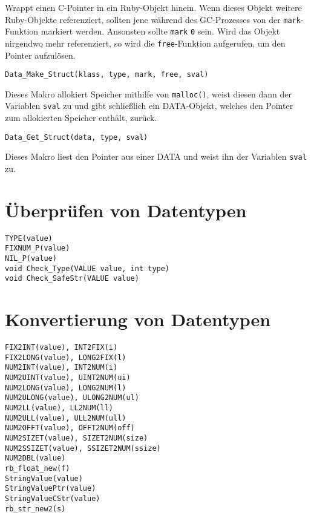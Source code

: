 \noindent Wrappt einen C-Pointer in ein Ruby-Objekt hinein. Wenn
dieses Objekt weitere Ruby-Objekte referenziert, sollten jene während
des GC-Prozesses von der \verb+mark+-Funktion markiert werden.
Ansonsten sollte \verb+mark+ \verb+0+ sein. Wird das Objekt nirgendwo
mehr referenziert, so wird die \verb+free+-Funktion aufgerufen, um den
Pointer aufzulösen.

\begin{lstlisting}
Data_Make_Struct(klass, type, mark, free, sval)
\end{lstlisting}

\noindent Dieses Makro allokiert Speicher mithilfe von
\verb+malloc()+, weist diesen dann der Variablen \verb+sval+ zu und
gibt schließlich ein DATA-Objekt, welches den Pointer zum allokierten
Speicher enthält, zurück.

\begin{lstlisting}
Data_Get_Struct(data, type, sval)
\end{lstlisting}

\noindent Dieses Makro liest den Pointer aus einer DATA und weist ihn
der Variablen \verb+sval+ zu.

\section{Überprüfen von Datentypen}
\label{sec:api:datentypen}

\begin{lstlisting}
TYPE(value)
FIXNUM_P(value)
NIL_P(value)
void Check_Type(VALUE value, int type)
void Check_SafeStr(VALUE value)
\end{lstlisting}

\section{Konvertierung von Datentypen}
\label{sec:api-konvertieren}

\begin{lstlisting}
FIX2INT(value), INT2FIX(i)
FIX2LONG(value), LONG2FIX(l)
NUM2INT(value), INT2NUM(i)
NUM2UINT(value), UINT2NUM(ui)
NUM2LONG(value), LONG2NUM(l)
NUM2ULONG(value), ULONG2NUM(ul)
NUM2LL(value), LL2NUM(ll)
NUM2ULL(value), ULL2NUM(ull)
NUM2OFFT(value), OFFT2NUM(off)
NUM2SIZET(value), SIZET2NUM(size)
NUM2SSIZET(value), SSIZET2NUM(ssize)
NUM2DBL(value)
rb_float_new(f)
StringValue(value)
StringValuePtr(value)
StringValueCStr(value)
rb_str_new2(s)
\end{lstlisting}



